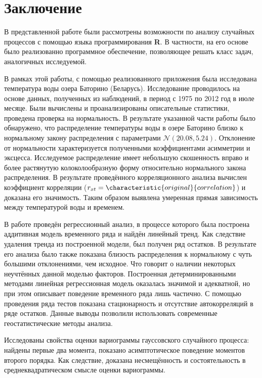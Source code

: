 
\chapter*{Заключение}

В представленной работе были рассмотрены возможности по анализу случайных процессов с помощью языка программирования \textbf{R}. В частности, на его основе было реализованно программное обеспечение, позволяющее решать класс задач, аналогичных исследуемой.

В рамках этой работы, с помощью реализованного приложения была исследована температура воды озера Баторино (Беларусь). Исследование проводилось на основе данных, полученных из наблюдений, в период с 1975 по 2012 год в июле месяце. Были вычислены и проанализированы описательные статистики, проведена проверка на нормальность. В результате указанной части работы было обнаружено, что распределение температуры воды в озере Баторино близко к нормальному закону распределения с параметрами $\mathcal{N}(20.08, 5.24)$. Отклонение от нормальности характеризуется полученными коэффициентами асимметрии и эксцесса. Исследуемое распределение имеет небольшую скошенность вправо и более растянутую колоколообразную форму относительно нормального закона распределения. В результате проведённого корреляционного анализа вычислен коэффициент корреляции ($ r_{xt} = \characteristic{original}{correlation} $) и доказана его значимость. Таким образом выявлена умеренная прямая зависимость между температурой воды и временем.

В работе проведён регрессионный анализ, в процессе которого была построена аддитивная модель временного ряда и найдён линейный тренд. Как следствие удаления тренда из построенной модели, был получен ряд остатков. В результате его анализа было также показана близость распределения к нормальному с чуть большими отклонениями, чем исходное. Что говорит о наличии некоторых неучтённых данной моделью факторов. Построенная детерминированными методами линейная регрессионная модель оказалась значимой и адекватной, но при этом описывает поведение временного ряда лишь частично. С помощью проведения ряда тестов показана стационарность и отсутствие автокорреляций в ряде остатков. Данные выводы позволили использовать современные геостатистические методы анализа.

Исследованы свойства оценки вариограммы гауссовского случайного процесса: найдены первые два момента, показано асимптотическое поведение моментов второго порядка. Как следствие, доказана несмещённость и состоятельность в среднеквадратическом смысле оценки вариограммы.

